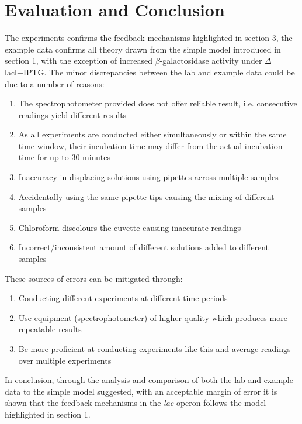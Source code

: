 \documentclass{article}
\begin{document}
\section{Evaluation and Conclusion}
The experiments confirms the feedback mechanisms highlighted in section 3, the example data confirms all theory drawn from the simple model introduced in section 1, with the exception of increased $\beta$-galactosidase activity under $\Delta$lacl+IPTG. The minor discrepancies between the lab and example data could be due to a number of reasons:
\begin{enumerate}
  \item The spectrophotometer provided does not offer reliable result, i.e. consecutive readings yield different results
  \item As all experiments are conducted either simultaneously or within the same time window, their incubation time may differ from the actual incubation time for up to 30 minutes
  \item Inaccuracy in displacing solutions using pipettes across multiple samples
  \item Accidentally using the same pipette tips causing the mixing of different samples
  \item Chloroform discolours the cuvette causing inaccurate readings
  \item Incorrect/inconsistent amount of different solutions added to different samples
\end{enumerate}
These sources of errors can be mitigated through:
\begin{enumerate}
  \item Conducting different experiments at different time periods
  \item Use equipment (spectrophotometer) of higher quality which produces more repeatable results
  \item Be more proficient at conducting experiments like this and average readings over multiple experiments
\end{enumerate}
In conclusion, through the analysis and comparison of both the lab and example data to the simple model suggested, with an acceptable margin of error it is shown that the feedback mechanisms in the \textit{lac} operon follows the model highlighted in section 1.



\end{document}

